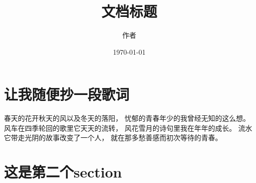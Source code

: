 \documentclass[UTF8]{ctexart}
\title{文档标题}
\author{作者}
\date{\today}
\begin{document}
\maketitle
\tableofcontents
\section{让我随便抄一段歌词}
春天的花开秋天的风以及冬天的落阳，
忧郁的青春年少的我曾经无知的这么想。
风车在四季轮回的歌里它天天的流转，
风花雪月的诗句里我在年年的成长。
流水它带走光阴的故事改变了一个人，
就在那多愁善感而初次等待的青春。

\section{这是第二个section}

\end{document}
